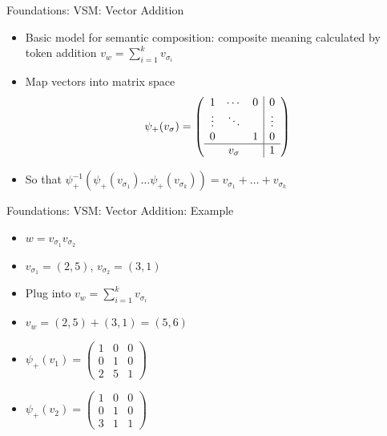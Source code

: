 \documentclass[12pt,a4paper]{beamer}
\begin{document}
\begin{frame}{Foundations: VSM: Vector Addition}
\begin{itemize}
\item Basic model for semantic composition: composite meaning calculated by token addition $v_{w} = \sum_{i=1}^{k}v_{\sigma_{i}}$
\item Map vectors into matrix space
$$  \psi_{+}(v_{\sigma}) =
\left( \begin{array}{ccc|c}
1 & \cdots & 0 & 0 \\
\vdots & \ddots & & \vdots \\
0 &  & 1 & 0 \\ \hline
&  v_{\sigma} & & 1 \end{array} \right) $$
\item So that $\psi_{+}^{-1} (\psi_{+}(v_{\sigma_{1}}) \ldots \psi_{+}(v_{\sigma_{k}})) = v_{\sigma_{1}} + \ldots + v_{\sigma_{k}}$
\end{itemize}
\end{frame}

\begin{frame}{Foundations: VSM: Vector Addition: Example}
\begin{itemize}
\item $w = v_{\sigma_{1}}v_{\sigma_{2}}$
\item $v_{\sigma_{1}} = (2,5)$, $v_{\sigma_{2}} = (3,1)$
\item Plug into $v_{w} = \sum_{i=1}^{k}v_{\sigma_{i}}$
\item $v_{w} = (2,5)+(3,1) = (5,6)$
\item $\psi_{+}(v_{1}) = \left( \begin{array}{cc|c}
1 & 0 & 0 \\
0 & 1 & 0 \\
2 & 5 & 1 \end{array} \right) $
\item  $\psi_{+}(v_{2}) = \left( \begin{array}{cc|c}
1 & 0 & 0 \\
0 & 1 & 0 \\
3 & 1 & 1 \end{array} \right) $
\end{itemize}
\end{frame}
\end{document}

